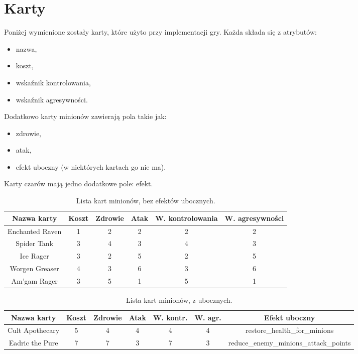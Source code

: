 \pagebreak
\section{Karty}

Poniżej wymienione zostały karty, które użyto przy implementacji gry. Każda składa się z atrybutów:

\begin{itemize}
	\item nazwa,
	\item koszt,
	\item wskaźnik kontrolowania,
	\item wskaźnik agresywności.
\end{itemize}

Dodatkowo karty minionów zawierają pola takie jak:

\begin{itemize}
	\item zdrowie,
	\item atak,
	\item efekt uboczny (w niektórych kartach go nie ma).
\end{itemize}

Karty czarów mają jedno dodatkowe pole: efekt.

\begin{table}[H]
	\centering
	\begin{tabular}{|c|c|c|c|c|c|}
		\hline
		\textbf{Nazwa karty} & \textbf{Koszt} & \textbf{Zdrowie} & \textbf{Atak} & \textbf{W. kontrolowania} & \textbf{W. agresywności} \\
		\hline
		Enchanted Raven & 1 & 2 & 2 & 2 & 2 \\
		\hline
		Spider Tank & 3 & 4 & 3 & 4 & 3 \\
		\hline
		Ice Rager & 3 & 2 & 5 & 2 & 5 \\
		\hline
		Worgen Greaser & 4 & 3 & 6 & 3 & 6 \\
		\hline
		Am'gam Rager & 3 & 5 & 1 & 5 & 1 \\
		\hline
	\end{tabular}
	\caption{Lista kart minionów, bez efektów ubocznych.}
\end{table}


\begin{table}[H]
	\centering
	\begin{tabular}{|c|c|c|c|c|c|c|}
		\hline
		\textbf{Nazwa karty} & \textbf{Koszt} & \textbf{Zdrowie} & \textbf{Atak} & \textbf{W. kontr.} & \textbf{W. agr.} & \textbf{Efekt uboczny} \\
		\hline
		Cult Apothecary & 5 & 4 & 4 & 4 & 4 & restore\_health\_for\_minions \\
		\hline
		Eadric the Pure & 7 & 7 & 3 & 7 & 3 & reduce\_enemy\_minions\_attack\_points \\
		\hline
	\end{tabular}
		\caption{Lista kart minionów, z ubocznych.}
\end{table}

